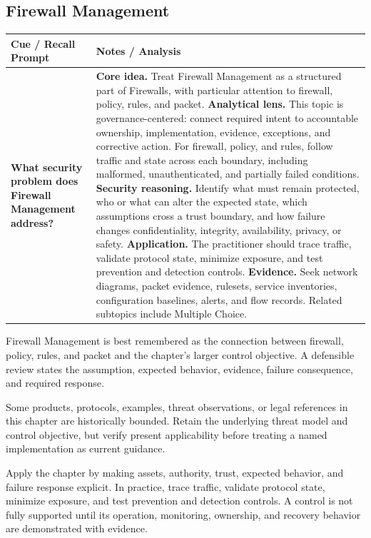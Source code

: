 \documentclass[11pt]{article}
\newcommand{\CornellHeader}{%
\rowcolor{Navy}\color{white}\bfseries Cue / Recall Prompt & \color{white}\bfseries Notes / Analysis\\\hline}
\newcommand{\CornellRow}[2]{%
\cellcolor{CueGray}\RaggedRight\textbf{#1} & \RaggedRight #2\\\hline}
\begin{document}
\subsection*{Firewall Management}
\begin{longtable}{>{\RaggedRight\arraybackslash}p{}|>{\RaggedRight\arraybackslash}p{}}
\CornellHeader
\CornellRow{What security problem does Firewall Management address?}{\textbf{Core idea.} Treat Firewall Management as a structured part of Firewalls, with particular attention to firewall, policy, rules, and packet. \textbf{Analytical lens.} This topic is governance-centered: connect required intent to accountable ownership, implementation, evidence, exceptions, and corrective action. For firewall, policy, and rules, follow traffic and state across each boundary, including malformed, unauthenticated, and partially failed conditions. \textbf{Security reasoning.} Identify what must remain protected, who or what can alter the expected state, which assumptions cross a trust boundary, and how failure changes confidentiality, integrity, availability, privacy, or safety. \textbf{Application.} The practitioner should trace traffic, validate protocol state, minimize exposure, and test prevention and detection controls. \textbf{Evidence.} Seek network diagrams, packet evidence, rulesets, service inventories, configuration baselines, alerts, and flow records. Related subtopics include Multiple Choice.}
\end{longtable}
\begin{topicsummary}
Firewall Management is best remembered as the connection between firewall, policy, rules, and packet and the chapter's larger control objective. A defensible review states the assumption, expected behavior, evidence, failure consequence, and required response.
\end{topicsummary}
\begin{historybox}
Some products, protocols, examples, threat observations, or legal references in this chapter are historically bounded. Retain the underlying threat model and control objective, but verify present applicability before treating a named implementation as current guidance.
\end{historybox}
\begin{defensebox}
Apply the chapter by making assets, authority, trust, expected behavior, and failure response explicit. In practice, trace traffic, validate protocol state, minimize exposure, and test prevention and detection controls. A control is not fully supported until its operation, monitoring, ownership, and recovery behavior are demonstrated with evidence.
\end{defensebox}
\end{document}
